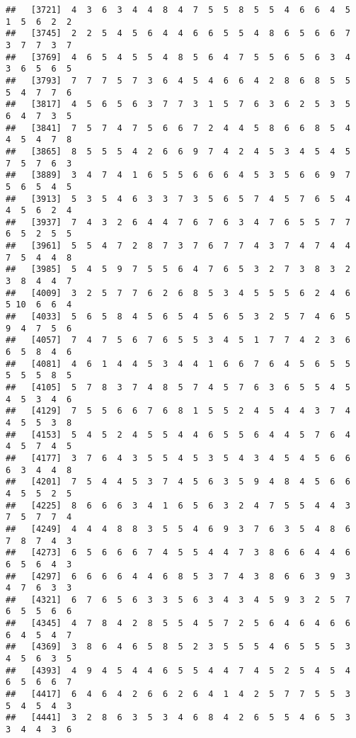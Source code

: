\documentclass[
]{book}
\begin{document}
\begin{verbatim}
##   [3721]  4  3  6  3  4  4  8  4  7  5  5  8  5  5  4  6  6  4  5  1  5  6  2  2
##   [3745]  2  2  5  4  5  6  4  4  6  6  5  5  4  8  6  5  6  6  7  3  7  7  3  7
##   [3769]  4  6  5  4  5  5  4  8  5  6  4  7  5  5  6  5  6  3  4  3  6  5  6  5
##   [3793]  7  7  7  5  7  3  6  4  5  4  6  6  4  2  8  6  8  5  5  5  4  7  7  6
##   [3817]  4  5  6  5  6  3  7  7  3  1  5  7  6  3  6  2  5  3  5  6  4  7  3  5
##   [3841]  7  5  7  4  7  5  6  6  7  2  4  4  5  8  6  6  8  5  4  4  5  4  7  8
##   [3865]  8  5  5  5  4  2  6  6  9  7  4  2  4  5  3  4  5  4  5  7  5  7  6  3
##   [3889]  3  4  7  4  1  6  5  5  6  6  6  4  5  3  5  6  6  9  7  5  6  5  4  5
##   [3913]  5  3  5  4  6  3  3  7  3  5  6  5  7  4  5  7  6  5  4  4  5  6  2  4
##   [3937]  7  4  3  2  6  4  4  7  6  7  6  3  4  7  6  5  5  7  7  6  5  2  5  5
##   [3961]  5  5  4  7  2  8  7  3  7  6  7  7  4  3  7  4  7  4  4  7  5  4  4  8
##   [3985]  5  4  5  9  7  5  5  6  4  7  6  5  3  2  7  3  8  3  2  3  8  4  4  7
##   [4009]  3  2  5  7  7  6  2  6  8  5  3  4  5  5  5  6  2  4  6  5 10  6  6  4
##   [4033]  5  6  5  8  4  5  6  5  4  5  6  5  3  2  5  7  4  6  5  9  4  7  5  6
##   [4057]  7  4  7  5  6  7  6  5  5  3  4  5  1  7  7  4  2  3  6  6  5  8  4  6
##   [4081]  4  6  1  4  4  5  3  4  4  1  6  6  7  6  4  5  6  5  5  5  5  5  8  5
##   [4105]  5  7  8  3  7  4  8  5  7  4  5  7  6  3  6  5  5  4  5  4  5  3  4  6
##   [4129]  7  5  5  6  6  7  6  8  1  5  5  2  4  5  4  4  3  7  4  4  5  5  3  8
##   [4153]  5  4  5  2  4  5  5  4  4  6  5  5  6  4  4  5  7  6  4  4  5  7  4  5
##   [4177]  3  7  6  4  3  5  5  4  5  3  5  4  3  4  5  4  5  6  6  6  3  4  4  8
##   [4201]  7  5  4  4  5  3  7  4  5  6  3  5  9  4  8  4  5  6  6  4  5  5  2  5
##   [4225]  8  6  6  6  3  4  1  6  5  6  3  2  4  7  5  5  4  4  3  7  5  7  7  4
##   [4249]  4  4  4  8  8  3  5  5  4  6  9  3  7  6  3  5  4  8  6  7  8  7  4  3
##   [4273]  6  5  6  6  6  7  4  5  5  4  4  7  3  8  6  6  4  4  6  6  5  6  4  3
##   [4297]  6  6  6  6  4  4  6  8  5  3  7  4  3  8  6  6  3  9  3  4  7  6  3  3
##   [4321]  6  7  6  5  6  3  3  5  6  3  4  3  4  5  9  3  2  5  7  6  5  5  6  6
##   [4345]  4  7  8  4  2  8  5  5  4  5  7  2  5  6  4  6  4  6  6  6  4  5  4  7
##   [4369]  3  8  6  4  6  5  8  5  2  3  5  5  5  4  6  5  5  5  3  4  5  6  3  5
##   [4393]  4  9  4  5  4  4  6  5  5  4  4  7  4  5  2  5  4  5  4  6  5  6  6  7
##   [4417]  6  4  6  4  2  6  6  2  6  4  1  4  2  5  7  7  5  5  3  5  4  5  4  3
##   [4441]  3  2  8  6  3  5  3  4  6  8  4  2  6  5  5  4  6  5  3  3  4  4  3  6

\end{verbatim}
\end{document}
